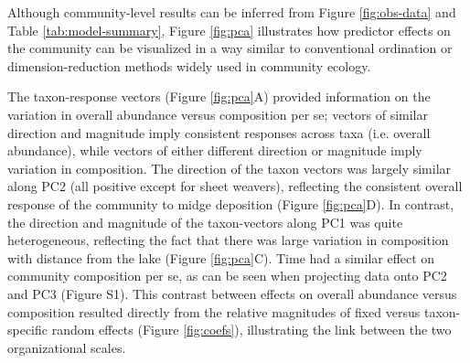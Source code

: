Although community-level results can be inferred from Figure \ref{fig:obs-data} and
Table \ref{tab:model-summary}, Figure \ref{fig:pca} illustrates how predictor effects
on the community can be visualized in a way similar to conventional ordination or
dimension-reduction methods widely used in community ecology.

The taxon-response vectors (Figure \ref{fig:pca}A)
provided information on the variation in overall abundance versus composition per se;
vectors of similar direction and magnitude
imply consistent responses across taxa (i.e. overall abundance),
while vectors of either different direction or magnitude imply variation in composition.
The direction of the taxon vectors was largely similar along PC2 (all positive
except for sheet weavers), reflecting the consistent overall
response of the community to midge deposition (Figure \ref{fig:pca}D).
In contrast, the direction and magnitude
of the taxon-vectors along PC1 was quite heterogeneous,
reflecting the fact that there was large variation in composition with
distance from the lake (Figure \ref{fig:pca}C).
Time had a similar effect on community composition per se, as can be seen when
projecting data onto PC2 and PC3 (Figure S1).
This contrast between effects on overall abundance versus composition
resulted directly from the relative magnitudes
of fixed versus taxon-specific random effects (Figure \ref{fig:coefs}),
illustrating the link between the two organizational scales.
